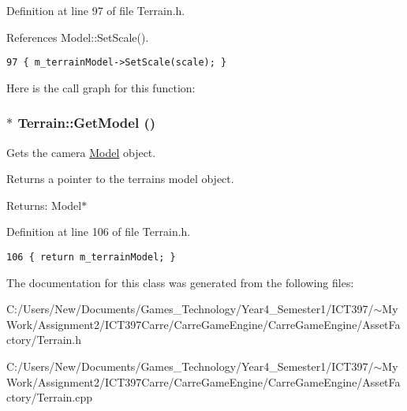 Definition at line 97 of file Terrain.h.

References Model::SetScale().

\begin{Code}\begin{verbatim}97 { m_terrainModel->SetScale(scale); }
\end{verbatim}
\end{Code}




Here is the call graph for this function:\hypertarget{class_terrain_3a0c740b9ab0a9f68617ee6fb893bf94}{
\subsubsection[GetModel]{$\ast$ Terrain::GetModel ()}}
\label{class_terrain_3a0c740b9ab0a9f68617ee6fb893bf94}


Gets the camera \hyperlink{class_model}{Model} object. 

Returns a pointer to the terrains model object.

\begin{Desc}
\item[Returns:]Model$\ast$ \end{Desc}


Definition at line 106 of file Terrain.h.

\begin{Code}\begin{verbatim}106 { return m_terrainModel; }
\end{verbatim}
\end{Code}




The documentation for this class was generated from the following files:\begin{CompactItemize}
\item 
C:/Users/New/Documents/Games\_\-Technology/Year4\_\-Semester1/ICT397/$\sim$My Work/Assignment2/ICT397Carre/CarreGameEngine/CarreGameEngine/AssetFactory/Terrain.h\item 
C:/Users/New/Documents/Games\_\-Technology/Year4\_\-Semester1/ICT397/$\sim$My Work/Assignment2/ICT397Carre/CarreGameEngine/CarreGameEngine/AssetFactory/Terrain.cpp\end{CompactItemize}
